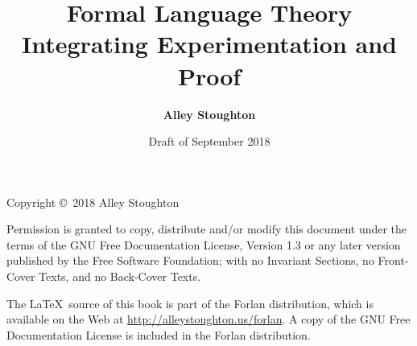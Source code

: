 \documentclass[11pt,twoside]{book}
\begin{document}

\title{\Huge\bf Formal Language Theory\\[.3cm]
\LARGE\bf Integrating Experimentation and Proof}

\author{\LARGE\bf Alley Stoughton}

\date{Draft of September 2018}

\titlepic{}

\maketitle

\thispagestyle{empty}

\noindent Copyright \copyright\ 2018 Alley Stoughton

\vspace{.5cm}
\noindent
Permission is granted to copy, distribute and/or modify this document
under the terms of the GNU Free Documentation License, Version 1.3 or
any later version published by the Free Software Foundation; with no
Invariant Sections, no Front-Cover Texts, and no Back-Cover Texts.

The \LaTeX\ source of this book is part of the Forlan distribution,
which is available on the Web at \url{http://alleystoughton.us/forlan}.  A
copy of the GNU Free Documentation License is included in the
Forlan distribution.

\clearemptydoublepage

\tableofcontents

\clearemptydoublepage

\listoffigures

\clearemptydoublepage






\clearemptydoublepage



\clearemptydoublepage







\clearemptydoublepage

{\small
\printindex}
\end{document}
